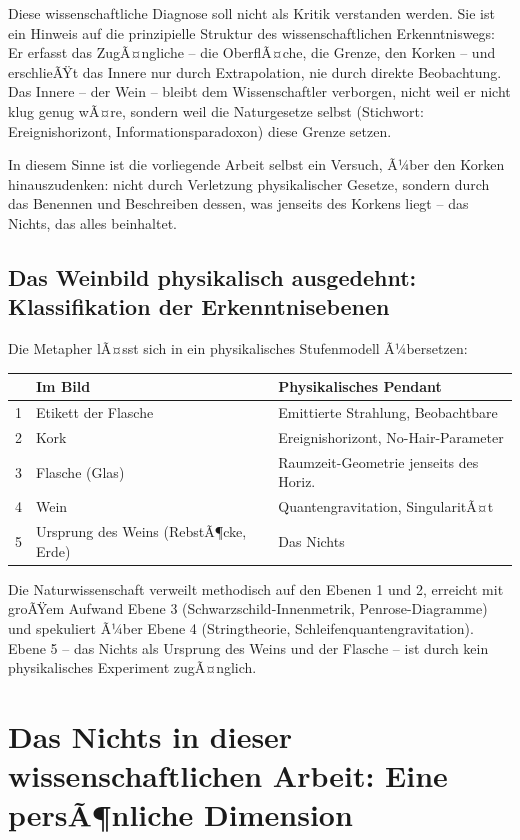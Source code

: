 ﻿\documentclass[12pt,a4paper]{report}
\begin{document}
Diese wissenschaftliche Diagnose soll nicht als Kritik verstanden werden. Sie ist ein Hinweis auf die prinzipielle Struktur des wissenschaftlichen Erkenntniswegs: Er erfasst das ZugÃ¤ngliche -- die OberflÃ¤che, die Grenze, den Korken -- und erschlieÃŸt das Innere nur durch Extrapolation, nie durch direkte Beobachtung. Das Innere -- der Wein -- bleibt dem Wissenschaftler verborgen, nicht weil er nicht klug genug wÃ¤re, sondern weil die Naturgesetze selbst (Stichwort: Ereignishorizont, Informationsparadoxon) diese Grenze setzen.

In diesem Sinne ist die vorliegende Arbeit selbst ein Versuch, Ã¼ber den Korken hinauszudenken: nicht durch Verletzung physikalischer Gesetze, sondern durch das Benennen und Beschreiben dessen, was jenseits des Korkens liegt -- das Nichts, das alles beinhaltet.

\subsection{Das Weinbild physikalisch ausgedehnt: Klassifikation der Erkenntnisebenen}

Die Metapher lÃ¤sst sich in ein physikalisches Stufenmodell Ã¼bersetzen:

\begin{center}
\begin{tabular}{lll}
	\hline
	\textbf{} & \textbf{Im Bild} & \textbf{Physikalisches Pendant} \\
	\hline
	1 & Etikett der Flasche & Emittierte Strahlung, Beobachtbare \\
	2 & Kork & Ereignishorizont, No-Hair-Parameter \\
	3 & Flasche (Glas) & Raumzeit-Geometrie jenseits des Horiz. \\
	4 & Wein & Quantengravitation, SingularitÃ¤t \\
	5 & Ursprung des Weins (RebstÃ¶cke, Erde) & Das Nichts \\
	\hline
\end{tabular}
\end{center}

Die Naturwissenschaft verweilt methodisch auf den Ebenen 1 und 2, erreicht mit groÃŸem Aufwand Ebene 3 (Schwarzschild-Innenmetrik, Penrose-Diagramme) und spekuliert Ã¼ber Ebene 4 (Stringtheorie, Schleifenquantengravitation). Ebene 5 -- das Nichts als Ursprung des Weins und der Flasche -- ist durch kein physikalisches Experiment zugÃ¤nglich.

\section{Das Nichts in dieser wissenschaftlichen Arbeit: Eine persÃ¶nliche Dimension}
\end{document}
